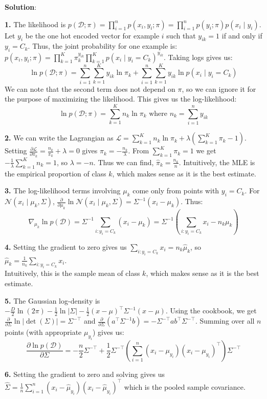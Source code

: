 \documentclass[submit]{../harvardml}
\newenvironment{solution}{
    \vspace{2mm}
    \color{blue}\noindent\textbf{Solution}:
}{}
\begin{document}
\begin{solution}
\textbf{1.} The likelihood is $p(\mathcal{D}; \pi) = \prod_{i=1}^n p(x_i, y_i; \pi) = \prod_{i=1}^n p(y_i; \pi) p(x_i \mid y_i)$. Let $y_i$ be the one hot encoded vector for example $i$ such that $y_{ik} = 1$ if and only if $y_i = C_k$. Thus, the joint probability for one example is: $p(x_i, y_i; \pi) = \prod_{k=1}^K \pi_k^{y_{ik}} \prod_{k=1}^K p(x_i \mid y_i = C_k)^{y_{ik}}$. Taking logs gives us:
\[
\ln p(\mathcal{D}; \pi) = \sum_{i=1}^n \sum_{k=1}^K y_{ik} \ln \pi_k + \sum_{i=1}^n \sum_{k=1}^K y_{ik} \ln p(x_i \mid y_i = C_k)
\]
We can note that the second term does not depend on $\pi$, so we can ignore it for the purpose of maximizing the likelihood. This gives us the log-likelihood:
\[
\ln p(\mathcal{D}; \pi) = \sum_{k=1}^K n_k \ln \pi_k \text{ where } n_k = \sum_{i=1}^n y_{ik}
\]

\textbf{2.} We can write the Lagrangian as $\mathcal{L} = \sum_{k=1}^K n_k \ln \pi_k + \lambda\left(\sum_{k=1}^K \pi_k - 1\right)$. Setting $\frac{\partial \mathcal{L}}{\partial \pi_k} = \frac{n_k}{\pi_k} + \lambda = 0$ gives $\pi_k = -\frac{n_k}{\lambda}$. From $\sum_{k=1}^K \pi_k = 1$ we get $-\frac{1}{\lambda} \sum_{k=1}^K n_k = 1$, so $\lambda = -n$. Thus we can find, $\hat{\pi}_k = \frac{n_k}{n}$.
Intuitively, the MLE is the empirical proportion of class $k$, which makes sense as it is the best estimate.

\textbf{3.} The log-likelihood terms involving $\mu_k$ come only from points with $y_i = C_k$.
For $\mathcal{N}(x_i \mid \mu_k, \Sigma)$,
$\frac{\partial}{\partial \mu_k} \ln \mathcal{N}(x_i \mid \mu_k, \Sigma) = \Sigma^{-1}(x_i - \mu_k)$. Thus:
\[
\nabla_{\mu_k} \ln p(\mathcal{D}) = \Sigma^{-1} \sum_{i: y_i = C_k} (x_i - \mu_k) = \Sigma^{-1} \left(\sum_{i: y_i = C_k} x_i - n_k \mu_k\right)
\]

\textbf{4.} Setting the gradient to zero gives us $\sum_{i: y_i = C_k} x_i = n_k \hat{\mu}_k$, so $\hat{\mu}_k = \frac{1}{n_k}\sum_{i: y_i = C_k} x_i$.\\
Intuitively, this is the sample mean of class $k$, which makes sense as it is the best estimate.

\textbf{5.} The Gaussian log-density is $-\frac{D}{2}\ln(2\pi) - \frac{1}{2}\ln|\Sigma| - \frac{1}{2}(x - \mu)^\top \Sigma^{-1} (x - \mu)$. Using the cookbook, we get $\frac{\partial}{\partial \Sigma} \ln |\det(\Sigma)| = \Sigma^{-\top}$ and $\frac{\partial}{\partial \Sigma} (a^\top \Sigma^{-1}b) = -\Sigma^{-\top} a b^\top \Sigma^{-\top}$. Summing over all $n$ points (with appropriate $\mu_{y_i}$) gives us:
\[
\frac{\partial \ln p(\mathcal{D})}{\partial \Sigma} = -\frac{n}{2} \Sigma^{-\top} + \frac{1}{2}\Sigma^{-\top} \left(\sum_{i=1}^n (x_i - \mu_{y_i})(x_i - \mu_{y_i})^\top \right)\Sigma^{-\top}
\]

\textbf{6.} Setting the gradient to zero and solving gives us $\hat{\Sigma} = \frac{1}{n} \sum_{i=1}^n (x_i - \hat{\mu}_{y_i})(x_i - \hat{\mu}_{y_i})^\top$ which is the pooled sample covariance.
\end{solution}
\end{document}
